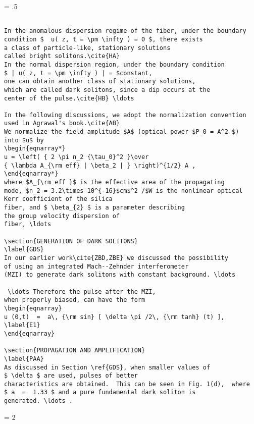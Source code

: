 \newpage
\baselineskip = .5\baselineskip  %
\begin{verbatim}

In the anomalous dispersion regime of the fiber, under the boundary
condition $  u( z, t = \pm \infty ) = 0 $, there exists
a class of particle-like, stationary solutions
called bright solitons.\cite{HA}
In the normal dispersion region, under the boundary condition
$ | u( z, t = \pm \infty ) | = $constant,
one can obtain another class of stationary solutions,
which are called dark solitons, since a dip occurs at the
center of the pulse.\cite{HB} \ldots

In the following discussions, we adopt the normalization convention
used in Agrawal's book.\cite{AB}
We normalize the field amplitude $A$ (optical power $P_0 = A^2 $)
into $u$ by
\begin{eqnarray*}
u = \left( { 2 \pi n_2 {\tau_0}^2 }\over
{ \lambda A_{\rm eff} | \beta_2 | } \right)^{1/2} A ,
\end{eqnarray*}
where $A_{\rm eff }$ is the effective area of the propagating
mode, $n_2 = 3.2\times 10^{-16}$cm$^2 /$W is the nonlinear optical
Kerr coefficient of the silica
fiber, and $ \beta_{2} $ is a parameter describing
the group velocity dispersion of
fiber, \ldots

\section{GENERATION OF DARK SOLITONS}
\label{GDS}
In our earlier work\cite{ZBD,ZBE} we discussed the possibility
of using an integrated Mach--Zehnder interferometer
(MZI) to generate dark solitons with constant background. \ldots

 \ldots Therefore the pulse after the MZI,
when properly biased, can have the form
\begin{eqnarray}
u (0,t)  =  a\, {\rm sin} [ \delta \pi /2\, {\rm tanh} (t) ],
\label{E1}
\end{eqnarray}

\section{PROPAGATION AND AMPLIFICATION}
\label{PAA}
As discussed in Section \ref{GDS}, when smaller values of
$ \delta $ are used, pulses of better
characteristics are obtained.  This can be seen in Fig. 1(d),  where
$ a  =  1.33 $ and a pure fundamental dark soliton is
generated. \ldots .

\end{verbatim}
\newpage
\baselineskip = 2\baselineskip  %

